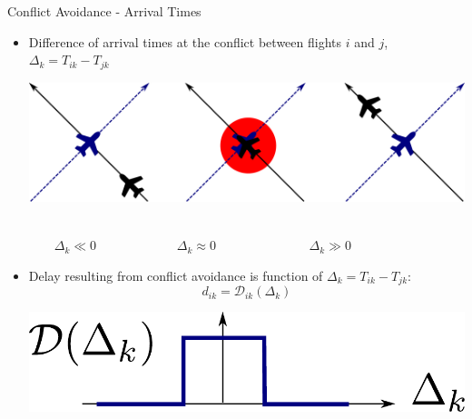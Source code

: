 \documentclass[10pt]{beamer}
\begin{document}
\begin{frame}[t]{Conflict Avoidance - Arrival Times}
    \begin{itemize}
        \item Difference of arrival times at the conflict between flights $i$ and $j$,  $\Delta_k = T_{ik} - T_{jk}$ \\
            \hspace{0.5cm}

            \begin{minipage}[c]{0.9\linewidth}
                \includegraphics[width=1.0\textwidth]{images/conflict_avoiding_arrival_times.pdf}
                \\ 
            \end{minipage}
            \hspace{0.5cm}
            \\
            $\qquad \Delta_k \ll 0$
            $\qquad \qquad \qquad \Delta_k \approx 0$
            $\quad \qquad \qquad \qquad \Delta_k \gg 0$
        \item Delay resulting from conflict avoidance is function of $\Delta_k = T_{ik} - T_{jk}$:
            \begin{equation*}
                d_{ik} = \mathcal{D}_{ik}(\Delta_k)
            \end{equation*}
            \hfill 
            \begin{minipage}[c]{0.3\linewidth}
                \vspace{-1cm}
                \includegraphics[width=1.0\textwidth]{images/conflict_delay_function.pdf}
            \end{minipage}
    \end{itemize} 
\end{frame}
\end{document}
